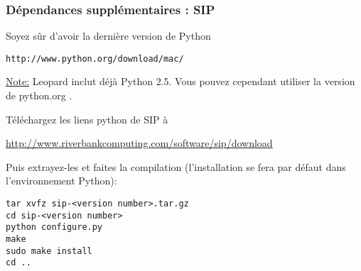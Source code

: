 % 
% 
% 
% 
% 
% 
% 
% 
% 

\subsubsection{Dépendances supplémentaires : SIP}
Soyez sûr d'avoir la dernière version de Python

\begin{verbatim}
http://www.python.org/download/mac/
\end{verbatim}

\underline{Note:} Leopard inclut déjà Python 2.5.  Vous pouvez cependant utiliser la version de python.org .

Téléchargez les liens python de SIP à

\url{http://www.riverbankcomputing.com/software/sip/download}

Puis extrayez-les et faites la compilation (l'installation se fera par défaut dans l'environnement Python):

\begin{verbatim}
tar xvfz sip-<version number>.tar.gz 
cd sip-<version number>
python configure.py 
make 
sudo make install 
cd ..  
\end{verbatim}


